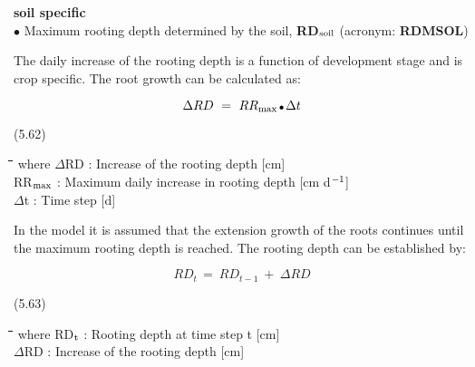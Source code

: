 {\bf soil specific}\\
$\bullet$ Maximum rooting depth determined by the soil, {\bf RD$_{{\rm soil}}$} (acronym: {\bf RDMSOL})



The daily increase of the rooting depth is a function of development stage and is crop
specific. The root growth can be calculated as:

\begin{displaymath}
\Delta RD~=~RR _{\max } \, {\rm \Bullet{0.75ex}}\, \Delta t
\end{displaymath}

 
\strut\hfill (5.62)
\nwln
\begin{tabbing}
\hspace{1.27cm}\=\hspace{1.27cm}\=\hspace{1.27cm}\=\hspace{1.27cm}\=%
\hspace{1.27cm}\=\hspace{1.27cm}\=\hspace{1.27cm}\=\hspace{1.27cm}\=%
\hspace{1.27cm}\=\hspace{1.27cm}\=\kill
where $\Delta$RD : Increase of the rooting depth         [cm]\\
RR$_{{\rm max}}$ : Maximum daily increase in rooting depth         [cm d$^{{\rm -}{1}}$]\\
$\Delta$t : Time step         [d]
\end{tabbing}





 In the model it is assumed that the extension growth of the roots continues until the
maximum rooting depth is reached. The rooting depth can be established by:

\begin{displaymath}
RD _{t~} =~RD _{t-1} ~+~\Delta RD
\end{displaymath}

 
\strut\hfill (5.63)
\nwln
\begin{tabbing}
\hspace{1.27cm}\=\hspace{1.27cm}\=\hspace{1.27cm}\=\hspace{1.27cm}\=%
\hspace{1.27cm}\=\hspace{1.27cm}\=\hspace{1.27cm}\=\hspace{1.27cm}\=%
\hspace{1.27cm}\=\hspace{1.27cm}\=\kill
where RD$_{{\rm t}}$ : Rooting depth at time step t        [cm]\\
$\Delta$RD : Increase of the rooting depth         [cm]
\end{tabbing}


